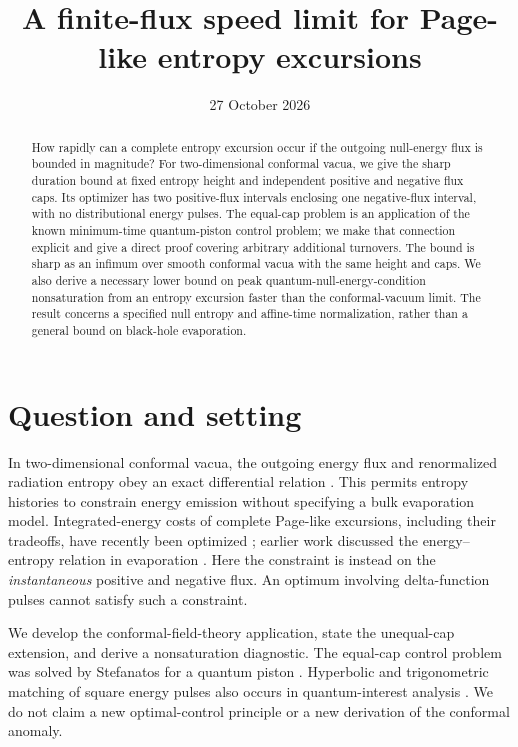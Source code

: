 \documentclass[10pt]{article}
\title{A finite-flux speed limit for Page-like entropy excursions}
\author{}
\date{27 October 2026}
\begin{document}
\maketitle
\vspace{-1.7em}
\begin{abstract}
How rapidly can a complete entropy excursion occur if the outgoing null-energy
flux is bounded in magnitude? For two-dimensional conformal vacua, we give the
sharp duration bound at fixed entropy height and independent positive and
negative flux caps. Its optimizer has two positive-flux intervals enclosing one
negative-flux interval, with no distributional energy pulses. The equal-cap
problem is an application of the known minimum-time quantum-piston control
problem; we make that connection explicit and give a direct proof covering
arbitrary additional turnovers. The bound is sharp as an infimum over smooth
conformal vacua with the same height and caps. We also derive a necessary lower
bound on peak quantum-null-energy-condition nonsaturation from an entropy
excursion faster than the conformal-vacuum limit. The result concerns a specified
null entropy and affine-time normalization, rather than a general bound on
black-hole evaporation.
\end{abstract}

\section{Question and setting}

In two-dimensional conformal vacua, the outgoing energy flux and renormalized
radiation entropy obey an exact differential relation \cite{BS}. This permits
entropy histories to constrain energy emission without specifying a bulk
evaporation model. Integrated-energy costs of complete Page-like excursions,
including their tradeoffs, have recently been optimized \cite{KD}; earlier
work discussed the energy--entropy relation in evaporation \cite{AP}. Here the
constraint is instead on the \emph{instantaneous} positive and negative flux.
An optimum involving delta-function pulses cannot satisfy such a constraint.

We develop the conformal-field-theory application, state the unequal-cap
extension, and derive a nonsaturation diagnostic. The equal-cap control problem was
solved by Stefanatos for a quantum piston \cite{Stefanatos}. Hyperbolic and
trigonometric matching of square energy pulses also occurs in quantum-interest
analysis \cite{TW}. We do not claim a new optimal-control principle or a new
derivation of the conformal anomaly.
\end{document}
